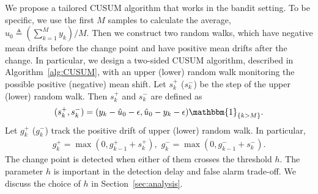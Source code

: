 \documentclass[letterpaper]{article} %
\begin{document}
We propose a tailored CUSUM algorithm that works in the bandit setting.
To be specific, we use the first $M$ samples to calculate the average, $\hat{u}_0\triangleq({\sum_{k=1}^My_k})/{M}.$
Then we construct two random walks, which have negative mean drifts before the change point and have positive mean drifts after the change. In particular, we design a two-sided CUSUM algorithm, described in Algorithm~\ref{alg:CUSUM}, with an upper (lower) random walk monitoring the possible positive (negative) mean shift. Let $s_k^+$ ($s_k^-$) be the step of the upper (lower) random walk. Then $s_k^+$ and $s_k^-$ are defined as
\begin{equation}\label{twoCUSUM}
(s_{k}^+,s_{k}^-)=(y_k-\hat{u}_0-\epsilon,\hat{u}_0-y_k-\epsilon)\mathbbm{1}_{\{k>M\}}.
\end{equation}
Let $g_k^+$ ($g_k^-$) track the positive drift of upper (lower) random walk. In particular,
\begin{align}
\label{eqn:g+-}
g_k^+=\max(0,g_{k-1}^++s_k^+), \,\, g_k^-=\max(0,g_{k-1}^-+s_k^-).
\end{align}
The change point is detected when either of them crosses the threshold
$h$. The parameter $h$ is important in the detection delay and
false alarm trade-off. We discuss the choice of $h$ in Section~\ref{sec:analysis}.
\end{document}
